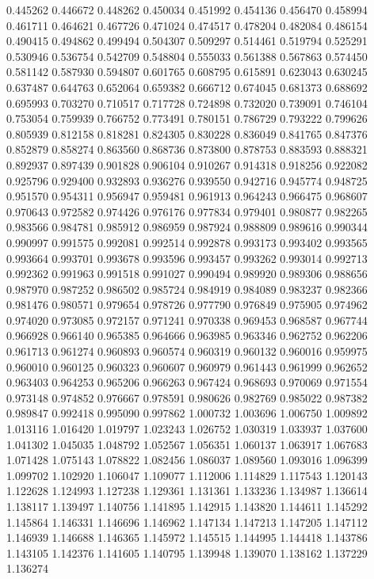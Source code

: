 0.445262
0.446672
0.448262
0.450034
0.451992
0.454136
0.456470
0.458994
0.461711
0.464621
0.467726
0.471024
0.474517
0.478204
0.482084
0.486154
0.490415
0.494862
0.499494
0.504307
0.509297
0.514461
0.519794
0.525291
0.530946
0.536754
0.542709
0.548804
0.555033
0.561388
0.567863
0.574450
0.581142
0.587930
0.594807
0.601765
0.608795
0.615891
0.623043
0.630245
0.637487
0.644763
0.652064
0.659382
0.666712
0.674045
0.681373
0.688692
0.695993
0.703270
0.710517
0.717728
0.724898
0.732020
0.739091
0.746104
0.753054
0.759939
0.766752
0.773491
0.780151
0.786729
0.793222
0.799626
0.805939
0.812158
0.818281
0.824305
0.830228
0.836049
0.841765
0.847376
0.852879
0.858274
0.863560
0.868736
0.873800
0.878753
0.883593
0.888321
0.892937
0.897439
0.901828
0.906104
0.910267
0.914318
0.918256
0.922082
0.925796
0.929400
0.932893
0.936276
0.939550
0.942716
0.945774
0.948725
0.951570
0.954311
0.956947
0.959481
0.961913
0.964243
0.966475
0.968607
0.970643
0.972582
0.974426
0.976176
0.977834
0.979401
0.980877
0.982265
0.983566
0.984781
0.985912
0.986959
0.987924
0.988809
0.989616
0.990344
0.990997
0.991575
0.992081
0.992514
0.992878
0.993173
0.993402
0.993565
0.993664
0.993701
0.993678
0.993596
0.993457
0.993262
0.993014
0.992713
0.992362
0.991963
0.991518
0.991027
0.990494
0.989920
0.989306
0.988656
0.987970
0.987252
0.986502
0.985724
0.984919
0.984089
0.983237
0.982366
0.981476
0.980571
0.979654
0.978726
0.977790
0.976849
0.975905
0.974962
0.974020
0.973085
0.972157
0.971241
0.970338
0.969453
0.968587
0.967744
0.966928
0.966140
0.965385
0.964666
0.963985
0.963346
0.962752
0.962206
0.961713
0.961274
0.960893
0.960574
0.960319
0.960132
0.960016
0.959975
0.960010
0.960125
0.960323
0.960607
0.960979
0.961443
0.961999
0.962652
0.963403
0.964253
0.965206
0.966263
0.967424
0.968693
0.970069
0.971554
0.973148
0.974852
0.976667
0.978591
0.980626
0.982769
0.985022
0.987382
0.989847
0.992418
0.995090
0.997862
1.000732
1.003696
1.006750
1.009892
1.013116
1.016420
1.019797
1.023243
1.026752
1.030319
1.033937
1.037600
1.041302
1.045035
1.048792
1.052567
1.056351
1.060137
1.063917
1.067683
1.071428
1.075143
1.078822
1.082456
1.086037
1.089560
1.093016
1.096399
1.099702
1.102920
1.106047
1.109077
1.112006
1.114829
1.117543
1.120143
1.122628
1.124993
1.127238
1.129361
1.131361
1.133236
1.134987
1.136614
1.138117
1.139497
1.140756
1.141895
1.142915
1.143820
1.144611
1.145292
1.145864
1.146331
1.146696
1.146962
1.147134
1.147213
1.147205
1.147112
1.146939
1.146688
1.146365
1.145972
1.145515
1.144995
1.144418
1.143786
1.143105
1.142376
1.141605
1.140795
1.139948
1.139070
1.138162
1.137229
1.136274
